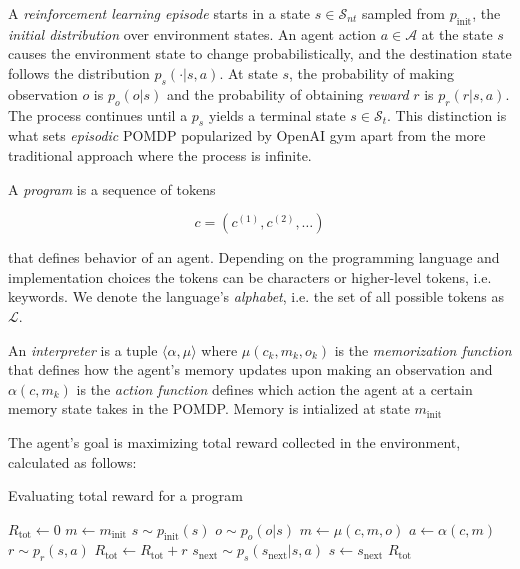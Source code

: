 A \emph{reinforcement learning episode} starts in a state $s \in \mathcal{S}_{nt}$ sampled from $p_\text{init}$, the {\em initial distribution} over environment states.
An agent action $a \in \mathcal{A}$ at the state $s$ causes the environment state to change probabilistically, and the destination state follows the distribution $p_s(\cdot | s, a)$. 
At state $s$, the probability of making observation $o$ is $p_o(o | s)$ and the probability of obtaining \emph{reward} $r$ is $p_r(r|s,a)$. 
The process continues until a $p_s$ yields a terminal state $s \in \mathcal{S}_t$.
This distinction is what sets \emph{episodic} POMDP popularized by OpenAI gym \cite{gym} apart from the more traditional approach \cite{pomdp1,pomdp2} where the process is infinite.

A \emph{program} is a sequence of tokens

\begin{equation}
    c=(c^{(1)},c^{(2)},\dots)
\end{equation}

that defines behavior of an agent.
Depending on the programming language and implementation choices the tokens can be characters or higher-level tokens, i.e. keywords.
We denote the language's \emph{alphabet}, i.e. the set of all possible tokens as $\mathcal{L}$.

An \emph{interpreter} is a tuple $\langle \alpha,\mu \rangle$ where $\mu(c_k,m_k,o_k)$ is the \emph{memorization function} that defines how the agent's memory updates upon making an observation and $\alpha(c, m_k)$ is the \emph{action function} defines which action the agent at a certain memory state takes in the POMDP.
Memory is intialized at state $m_\text{init}$

The agent's goal is maximizing total reward collected in the environment, calculated as follows:

\begin{algorithm}[H]
\begin{algorithmic}[1]
\caption{Evaluating total reward for a program}
\State $R_\text{tot} \gets 0$
\State $m \gets m_\text{init}$
\State $s \sim p_\text{init}(s)$
\State $o \sim p_o(o | s)$
\State $m \gets \mu(c,m,o)$
\State $a \gets \alpha(c, m)$ 
\State $r \sim p_r(s,a)$
\State $R_\text{tot} \gets R_\text{tot} + r$
\State $s_\text{next} \sim p_s(s_\text{next} | s, a)$
\State $s\gets s_\text{next}$
\EndWhile
\State \Return $R_\text{tot}$
\EndFunction
\end{algorithmic}
\end{algorithm}

